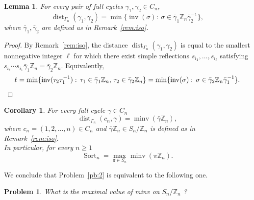 \documentclass[11pt]{amsart}
\newtheorem{lemma}[theorem]{Lemma}
\newtheorem{corollary}[theorem]{Corollary}
\newtheorem{problem}[theorem]{Problem}
\numberwithin{equation}{section}
\newcommand{\ZZ}{{\mathbb {Z}}}
\newcommand{\inv}{{\operatorname{inv}}}
\newcommand{\minv}{{\operatorname{minv}}}
\newcommand{\dist}{{\operatorname{dist}}}
\newcommand{\Sort}{{\operatorname{Sort}}}
\begin{document}


\begin{lemma}\label{lem:2} 
    For every pair of full cycles $\gamma_1, \gamma_2\in C_n$,
    \[
        \dist_{\Gamma_n}(\gamma_1,\gamma_2)=\min 
        \{\inv(\sigma):\ \sigma \in \bar\gamma_1 \ZZ_n \bar\gamma_2^{-1}\},  
    \]
    where $\bar\gamma_1, \bar\gamma_2$ are defined as in Remark~\ref{rem:iso}. 
\end{lemma}

\begin{proof} 
    By Remark~\ref{rem:iso}, the distance $\dist_{\Gamma_n}(\gamma_1, \gamma_2)$  
    is equal to the smallest nonnegative integer $\ell$ for which there exist simple reflections $s_{i_1},\ldots,s_{i_\ell}$ satisfying  $s_{i_\ell} \cdots s_{i_1} \bar\gamma_1\ZZ_n = \bar\gamma_2\ZZ_n$.  
    Equivalently, 
    \[
        \ell 
        = \min \{\inv(\tau_2 \tau_1^{-1}) :\, \tau_1 \in \bar\gamma_1\ZZ_n,\, \tau_2 \in \bar\gamma_2\ZZ_n\}
        = \min \{\inv(\sigma) :\, \sigma \in \bar\gamma_2 \ZZ_n \bar\gamma_1^{-1}\}.
        \qedhere
    \]
\end{proof}

\begin{corollary}\label{lem:1} 
    For every full cycle $\gamma \in C_n$
    \[
        \dist_{\Gamma_n}(c_n, \gamma) = \minv(\bar\gamma\ZZ_n),   
    \]
    where $c_n = (1,2,\dots,n) \in C_n$ and $\bar\gamma\ZZ_n \in S_n/\ZZ_n$ is defined as in Remark~\ref{rem:iso}.\\
    In particular, for every $n\ge 1$ 
    \[
        \Sort_n
        = \max_{\pi\in S_n} \minv(\pi \ZZ_n) .
    \]
\end{corollary}

We conclude that Problem~\ref{pb:2} is equivalent to the following one. 

\begin{problem}

    What is the maximal value of {\em minv} on $S_n/\ZZ_n$ ?
    

\end{problem}
\end{document}
